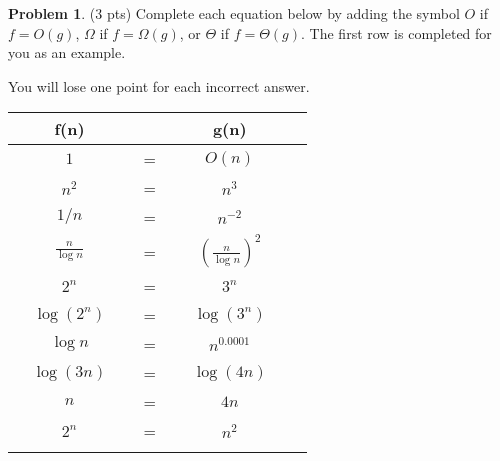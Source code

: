 \documentclass[12pt]{exam}
\newcommand*{\hl}[1]{\colorbox{yellow}{#1}}
\newcommand*{\answerLong}[2]{
    \ifprintanswers{\hl{#1}}
\else{#2}
\fi
}
\newcommand*{\answer}[1]{\answerLong{#1}{~}}
\theoremstyle{definition}
\newtheorem{problem}{Problem}
\begin{document}
\newpage
\begin{problem}
(3 pts)
    Complete each equation below by adding the symbol $O$ if $f=O(g)$, $\Omega$ if $f=\Omega(g)$, or $\Theta$ if $f=\Theta(g)$.  
    The first row is completed for you as an example.

    You will lose one point for each incorrect answer.

{\renewcommand{\arraystretch}{3.4}
\begin{tabular}{c c c c c c}
    & f(n) &~\hspace{0.5in}~$ $~\hspace{0.5in}~& g(n) &\\
    \hline
    & $1$ & ~\hspace{0.5in}~$=$~\hspace{0.5in}~  & $O(n)$ &  &\\
    \arrayrulecolor{gray}\hline
    & $n^2$ & ~\hspace{0.5in}~$=$~\hspace{0.5in}~  & \answer{$\Omega$} $n^3$ &  &\\
    \arrayrulecolor{gray}\hline
    & $1/n$ & ~\hspace{0.5in}~$=$~\hspace{0.5in}~  & \answer{$\Omega$} $n^{-2}$ &  &\\
    \arrayrulecolor{gray}\hline
    & $\frac n {\log n}$ & ~\hspace{0.5in}~$=$~\hspace{0.5in}~  & \answer{$O$} $\left(\frac n {\log n}\right)^2$ &  &\\
    \arrayrulecolor{gray}\hline
    & $2^{n}$ & ~\hspace{0.5in}~$=$~\hspace{0.5in}~  & \answer{$O$} $3^n$ &  &\\
    \arrayrulecolor{gray}\hline
    & $\log (2^n)$ & ~\hspace{0.5in}~$=$~\hspace{0.5in}~  & \answer{$\Theta$} $\log (3^n)$ &  &\\
    \arrayrulecolor{gray}\hline
    & $\log n$ & ~\hspace{0.5in}~$=$~\hspace{0.5in}~  & \answer{$O$} $n^{0.0001}$ &  &\\
    \arrayrulecolor{gray}\hline
    & $\log (3n)$ & ~\hspace{0.5in}~$=$~\hspace{0.5in}~  & \answer{$\Theta$} $\log (4n)$ &  &\\
    \arrayrulecolor{gray}\hline
    & $n$ & ~\hspace{0.5in}~$=$~\hspace{0.5in}~  & \answer{$\Theta$} $4n$ &  &\\
    \arrayrulecolor{gray}\hline
    & $2^n$ & ~\hspace{0.5in}~$=$~\hspace{0.5in}~  & \answer{$\Omega$} $n^2$ &  &\\
    \arrayrulecolor{gray}\hline


\end{tabular}}
\end{problem}
\end{document}
